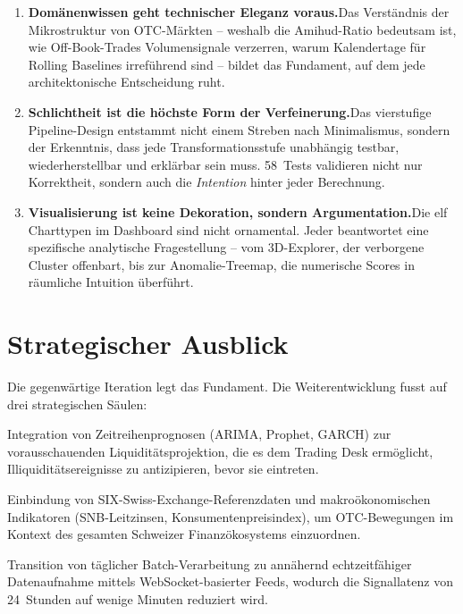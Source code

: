 \documentclass[11pt, a4paper, oneside, openany]{report}
\begin{document}
\begin{enumerate}[label=\textcolor{MetricBlue}{\textbf{(\roman*)}}]
  \item \textbf{Domänenwissen geht technischer Eleganz voraus.}\;Das Verständnis der Mikrostruktur von OTC-Märkten -- weshalb die Amihud-Ratio bedeutsam ist, wie Off-Book-Trades Volumensignale verzerren, warum Kalendertage für Rolling Baselines irreführend sind -- bildet das Fundament, auf dem jede architektonische Entscheidung ruht.
  \item \textbf{Schlichtheit ist die höchste Form der Verfeinerung.}\;Das vierstufige Pipeline-Design entstammt nicht einem Streben nach Minimalismus, sondern der Erkenntnis, dass jede Transformationsstufe unabhängig testbar, wiederherstellbar und erklärbar sein muss. 58~Tests validieren nicht nur Korrektheit, sondern auch die \emph{Intention} hinter jeder Berechnung.
  \item \textbf{Visualisierung ist keine Dekoration, sondern Argumentation.}\;Die elf Charttypen im Dashboard sind nicht ornamental. Jeder beantwortet eine spezifische analytische Fragestellung -- vom 3D-Explorer, der verborgene Cluster offenbart, bis zur Anomalie-Treemap, die numerische Scores in räumliche Intuition überführt.
\end{enumerate}

\section{Strategischer Ausblick}

Die gegenwärtige Iteration legt das Fundament. Die Weiterentwicklung fusst auf drei strategischen Säulen:

\begin{description}[style=nextline, leftmargin=1.5em]
  \item[\textcolor{SwissRed}{Säule~I\;---\;Prädiktive Analytik}]
  Integration von Zeitreihenprognosen (ARIMA, Prophet, GARCH) zur vorausschauenden Liquiditätsprojektion, die es dem Trading Desk ermöglicht, Illiquiditätsereignisse zu antizipieren, bevor sie eintreten.
  \item[\textcolor{SwissRed}{Säule~II\;---\;Marktübergreifende Anreicherung}]
  Einbindung von SIX-Swiss-Exchange-Referenzdaten und makroökonomischen Indikatoren (SNB-Leitzinsen, Konsumentenpreisindex), um OTC-Bewegungen im Kontext des gesamten Schweizer Finanzökosystems einzuordnen.
  \item[\textcolor{SwissRed}{Säule~III\;---\;Echtzeit-Streaming}]
  Transition von täglicher Batch-Verarbeitung zu annähernd echtzeitfähiger Datenaufnahme mittels WebSocket-basierter Feeds, wodurch die Signallatenz von 24~Stunden auf wenige Minuten reduziert wird.
\end{description}
\end{document}
